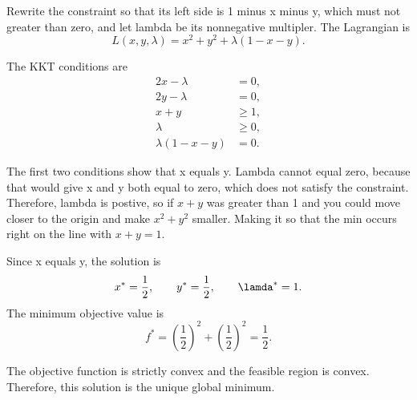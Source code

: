 \documentclass[12pt,fleqn]{article}
\begin{document}
Rewrite the constraint so that its left side is 1 minus x minus y, which must
not greater than zero, and let lambda be its nonnegative multipler. The
Lagrangian is
\[
L(x,y,\lambda)=x^2+y^2+\lambda(1-x-y).
\]

The KKT conditions are
\begin{align*}
2x-\lambda &= 0,\\
2y-\lambda &= 0,\\
x+y &\geq 1,\\
\lambda &\geq 0,\\
\lambda(1-x-y) &= 0.
\end{align*}

The first two conditions show that x equals y. Lambda cannot equal zero,
because that would give x and y both equal to zero, which does not satisfy the
constraint. Therefore, lambda is postive, so if $x+y$ was greater than 1 and you
could move closer to the origin and make $x^2+y^2$ smaller. Making it so that the
min occurs right on the line with $x+y=1$.

Since x equals y, the solution is
\[
x^*=\frac{1}{2}, \qquad y^*=\frac{1}{2}, \qquad \lamda^*=1.
\]
The minimum objective value is
\[
f^*=\left(\frac{1}{2}\right)^2+\left(\frac{1}{2}\right)^2
=\frac{1}{2}.
\]

The objective function is strictly convex and the feasible region is convex.
Therefore, this solution is the unique global minimum.
\end{document}
